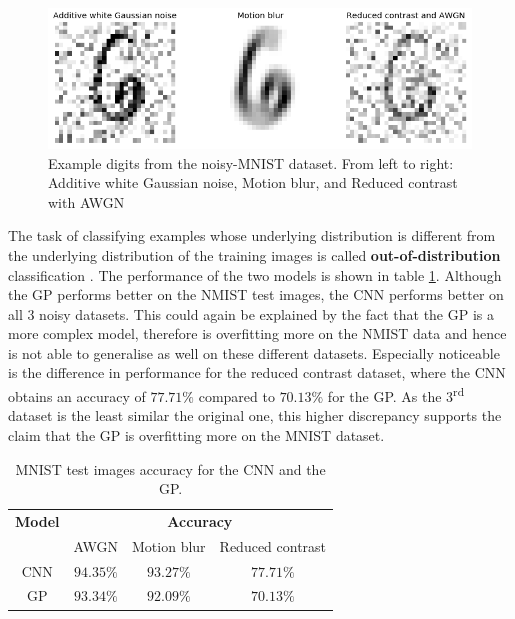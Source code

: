 \documentclass{article}
\begin{document}
\begin{figure}
	\centering
	\includegraphics[scale=0.2]{noisy_mnist_example}
	\caption{Example digits from the noisy-MNIST dataset. From left to right: Additive white Gaussian noise, Motion blur, and Reduced contrast with AWGN}
	\label{fig/noisy_mnist_example}
\end{figure}

The task of classifying examples whose underlying distribution is different from the underlying distribution of the training images is called \textbf{out-of-distribution} classification \cite{Gal2016Uncertainty}. The performance of the two models is shown in table \ref{table/noisy_mnist_acc}. Although the GP performs better on the NMIST test images, the CNN performs better on all 3 noisy datasets. This could again be explained by the fact that the GP is a more complex model, therefore is overfitting more on the NMIST data and hence is not able to generalise as well on these different datasets. Especially noticeable is the difference in performance for the reduced contrast dataset, where the CNN obtains an accuracy of $77.71\%$ compared to $70.13\%$ for the GP. As the 3\textsuperscript{rd} dataset is the least similar the original one, this higher discrepancy supports the claim that the GP is overfitting more on the MNIST dataset.

\begin{table}[h]
\centering	
{\renewcommand{\arraystretch}{1.2} %
\begin{tabular}{ c | c c c}
\textbf{Model} & \multicolumn{3}{c}{\textbf{Accuracy}}\\
& AWGN & Motion blur & Reduced contrast\\
\hline
CNN & $94.35\%$ & $93.27\%$ & $77.71\%$ \\
GP & $93.34\%$  & $92.09\%$ & $70.13\%$ \\
\end{tabular}
}
\caption{MNIST test images accuracy for the CNN and the GP.}
\label{table/noisy_mnist_acc}
\end{table}
\end{document}
